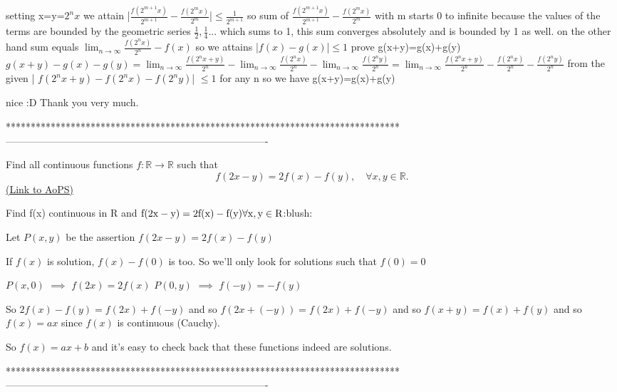 \begin{solution}
	\begin{tcolorbox}setting x=y=$ 2^nx$ we attain |$ \frac {f(2^{m + 1}x)}{2^{m + 1}} - \frac {f(2^{m}x)}{2^m}$|$ \le \frac {1}{2^{m + 1}}$
so sum of $ \frac {f(2^{m + 1}x)}{2^{m + 1}} - \frac {f(2^{m}x)}{2^m}$ with m starts 0 to infinite 
because the values of the terms are bounded by the geometric series $ \frac {1}{2}, \frac {1}{4}...$ which sums to 1, this sum converges absolutely and is bounded by 1 as well. on the other hand sum equals 
$ \lim_{n\to\infty} {\frac {f(2^{n}x)}{2^n}} - f(x)$
so we attains |$ f(x) - g(x)$|$ \le 1$
 prove  g(x+y)=g(x)+g(y)
$ g(x + y) - g(x) - g(y) = \lim_{n\to\infty} {\frac {f(2^{n}{x + y})}{2^n}} - \lim_{n\to\infty} {\frac {f(2^{n}x)}{2^n}} - \lim_{n\to\infty} {\frac {f(2^{n}y)}{2^n}} = \lim_{n\to\infty} {\frac {f(2^{n}{x + y})}{2^n} - \frac {f(2^{n}x)}{2^n} - \frac {f(2^{n}y)}{2^n}}$
from the given | $ f(2^{n}{x + y}) - f(2^{n}x) - f(2^{n}y)$| $ \le 1$ for any n
so we have g(x+y)=g(x)+g(y)\end{tcolorbox}
nice  :D 
Thank you very much.
\end{solution}
*******************************************************************************
-------------------------------------------------------------------------------

\begin{problem}
	Find all continuous functions $f: \mathbb R \to \mathbb R$ such that
\[ f(2x - y) = 2f(x) - f(y), \quad \forall x,y\in \mathbb R.\]
	\flushright \href{https://artofproblemsolving.com/community/c6h313064}{(Link to AoPS)}
\end{problem}



\begin{solution}
	\begin{tcolorbox}Find f(x) continuous in R and
$ {\rm{f(2x - y) = 2f(x) - f(y)}}\forall {\rm{x,y}} \in {\rm{R}}$:blush:\end{tcolorbox}
Let $ P(x,y)$ be the assertion $ f(2x - y) = 2f(x) - f(y)$

If $ f(x)$ is solution, $ f(x) - f(0)$ is too. So we'll only look for solutions such that $ f(0) = 0$

$ P(x,0)$ $ \implies$ $ f(2x) = 2f(x)$
$ P(0,y)$ $ \implies$ $ f( - y) = - f(y)$

So $ 2f(x) - f(y) = f(2x) + f( - y)$ and so $ f(2x + ( - y)) = f(2x) + f( - y)$ and so $ f(x + y) = f(x) + f(y)$ and so $ f(x) = ax$ since $ f(x)$ is continuous (Cauchy).

So $ f(x) = ax + b$ and it's easy to check back that these functions indeed are solutions.
\end{solution}
*******************************************************************************
-------------------------------------------------------------------------------

